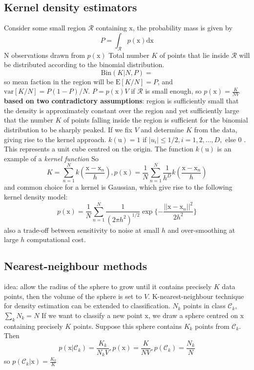 \documentclass[a4paper]{book}
\begin{document}
\subsection{Kernel density estimators}
Consider some small region $\mathcal R$ containing $\mathrm x$, the probability mass is given by
$$P=\int_{\mathcal R}p(\mathrm x)\mathrm {dx}$$
N observations drawn from $p(\mathrm x)$ \newline
Total number $K$ of points that lie inside $\mathcal R$ will be distributed according to the binomial distribution.
$$\mathrm {Bin}(K|N,P) =$$
so mean faction in the region will be $\mathrm E[K/N] = P$, and $\mathrm {var}[K/N] = P(1-P)/N$.\newline
$P=p(\mathrm x)V$ if $\mathcal R$ is small enough, so $p(\mathrm x) = \frac{K}{NV}$\newline
\textbf{based on two contradictory assumptions}: region is sufficiently small that the density is approximately constant over the region and yet sufficiently large that the number $K$ of points falling inside the region is sufficient for the binomial distribution to be sharply peaked.\newline
If we fix $V$ and determine $K$ from the data,  giving rise to the kernel approach.
$k(\mathrm u) =1$ if $|u_i|\leq 1/2, i=1, 2, \dots, D, $ else $0$ .\newline
This represents a unit cube centred on the origin. The function $k(\mathrm u)$ is an example of a \textit{kernel function}\newline
So $$K = \sum_{n=1}^Nk(\frac{\mathrm x-\mathrm x_n}{h}), p(\mathrm x) = \frac1N\sum_{n=1}^N\frac1{h^D}k(\frac{\mathrm x-\mathrm x_n}{h})$$
and common choice for a kernel is Gaussian, which give rise to the following kernel density model:
$$p(\mathrm x) = \frac1N\sum_{n=1}^N\frac{1}{(2\pi h^2)^{1/2}}\exp\{-\frac{||\mathrm x-\mathrm x_n||^2}{2h^2}\}$$
also a trade-off between sensitivity to noise at small $h$ and over-smoothing at large $h$\newline
computational cost.
\subsection{Nearest-neighbour methods}
idea: allow the radius of the sphere to grow until it contains precisely $K$ data points, then the volume of the sphere is set to $V$.\newline
K-nearest-neighbour technique for density estimation can be extended to classification.
$N_k$ points in class $\mathcal C_k$, $\sum_kN_k=N$
\newline
If we want to classify a new point $\mathrm x$, we draw a sphere centred on $\mathrm x$ containing precisely $K$ points. Suppose this sphere contains $K_k$ points from $\mathcal C_k$. Then
$$p(\mathrm x|\mathcal C_k) = \frac{K_k}{N_kV} , p(\mathrm x) = \frac{K}{NV}, p(\mathcal C_k) = \frac{N_k}{N}$$
so $p(\mathcal C_k|\mathrm x) = \frac{K_k}{K}$
\end{document}
